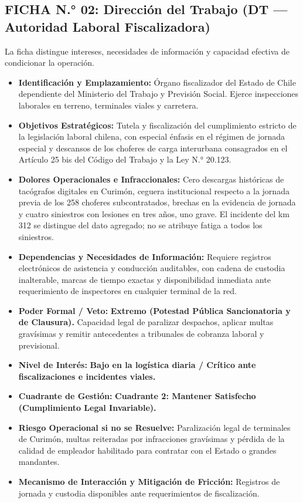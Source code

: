 \subsection*{FICHA N.° 02: Dirección del Trabajo (DT — Autoridad Laboral Fiscalizadora)}
La ficha distingue intereses, necesidades de información y capacidad efectiva de condicionar la operación.
\begin{itemize}
\item \textbf{Identificación y Emplazamiento:} Órgano fiscalizador del Estado de Chile dependiente del Ministerio del Trabajo y Previsión Social. Ejerce inspecciones laborales en terreno, terminales viales y carretera.
\item \textbf{Objetivos Estratégicos:} Tutela y fiscalización del cumplimiento estricto de la legislación laboral chilena, con especial énfasis en el régimen de jornada especial y descansos de los choferes de carga interurbana consagrados en el Artículo 25 bis del Código del Trabajo y la Ley N.° 20.123.
\item \textbf{Dolores Operacionales e Infraccionales:} Cero descargas históricas de tacógrafos digitales en Curimón, ceguera institucional respecto a la jornada previa de los 258 choferes subcontratados, brechas en la evidencia de jornada y cuatro siniestros con lesiones en tres años, uno grave. El incidente del km 312 se distingue del dato agregado; no se atribuye fatiga a todos los siniestros.
\item \textbf{Dependencias y Necesidades de Información:} Requiere registros electrónicos de asistencia y conducción auditables, con cadena de custodia inalterable, marcas de tiempo exactas y disponibilidad inmediata ante requerimiento de inspectores en cualquier terminal de la red.
\item \textbf{Poder Formal / Veto:} \textbf{Extremo (Potestad Pública Sancionatoria y de Clausura).} Capacidad legal de paralizar despachos, aplicar multas gravísimas y remitir antecedentes a tribunales de cobranza laboral y previsional.
\item \textbf{Nivel de Interés:} \textbf{Bajo en la logística diaria / Crítico ante fiscalizaciones e incidentes viales.}
\item \textbf{Cuadrante de Gestión:} \textbf{Cuadrante 2: Mantener Satisfecho (Cumplimiento Legal Invariable).}
\item \textbf{Riesgo Operacional si no se Resuelve:} Paralización legal de terminales de Curimón, multas reiteradas por infracciones gravísimas y pérdida de la calidad de empleador habilitado para contratar con el Estado o grandes mandantes.
\item \textbf{Mecanismo de Interacción y Mitigación de Fricción:} Registros de jornada y custodia disponibles ante requerimientos de fiscalización.
\end{itemize}
